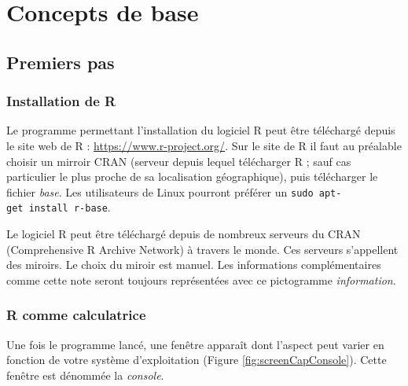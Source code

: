 \documentclass[]{book}
\makeatletter
\newenvironment{kframe}{%
\medskip{}
\setlength{\fboxsep}{.8em}
 \def\at@end@of@kframe{}%
 \ifinner\ifhmode%
  \def\at@end@of@kframe{\end{minipage}}%
  \begin{minipage}{\columnwidth}%
 \fi\fi%
 \def\FrameCommand##1{\hskip\@totalleftmargin \hskip-\fboxsep
 \colorbox{shadecolor}{##1}\hskip-\fboxsep
     \hskip-\linewidth \hskip-\@totalleftmargin \hskip\columnwidth}%
 \MakeFramed {\advance\hsize-\width
   \@totalleftmargin\z@ \linewidth\hsize
   \@setminipage}}%
 {\par\unskip\endMakeFramed%
 \at@end@of@kframe}
\newenvironment{rmdblock}[1]
  {
  \begin{itemize}
  \renewcommand{\labelitemi}{
    \raisebox{-.7\height}[0pt][0pt]{
      {\setkeys{Gin}{width=3em,keepaspectratio}\texttt{[image: myIcons/\#1]}} %
    }
  }
  \setlength{\fboxsep}{1em}
  \begin{kframe}
  \item
  }
  {
  \end{kframe}
  \end{itemize}
  }
\newenvironment{rmdnote}      %
  {\begin{rmdblock}{note}}    %
  {\end{rmdblock}}            %
\makeatother
\begin{document}
\part{Concepts de base}\label{part-concepts-de-base}

\chapter{Premiers pas}\label{premiersPas}

\section{Installation de R}\label{installation-de-r}

Le programme permettant l'installation du logiciel R peut être
téléchargé depuis le site web de R : \url{https://www.r-project.org/}.
Sur le site de R il faut au préalable choisir un mirroir CRAN (serveur
depuis lequel télécharger R ; sauf cas particulier le plus proche de sa
localisation géographique), puis télécharger le fichier \emph{base}. Les
utilisateurs de Linux pourront préférer un
\texttt{sudo\ apt-get\ install\ r-base}.

\begin{rmdnote}
Le logiciel R peut être téléchargé depuis de nombreux serveurs du CRAN
(Comprehensive R Archive Network) à travers le monde. Ces serveurs
s'appellent des miroirs. Le choix du miroir est manuel. Les informations
complémentaires comme cette note seront toujours représentées avec ce
pictogramme \emph{information}.
\end{rmdnote}

\section{R comme calculatrice}\label{r-comme-calculatrice}

Une fois le programme lancé, une fenêtre apparaît dont l'aspect peut
varier en fonction de votre système d'exploitation (Figure
\ref{fig:screenCapConsole}). Cette fenêtre est dénommée la
\emph{console}.
\end{document}
